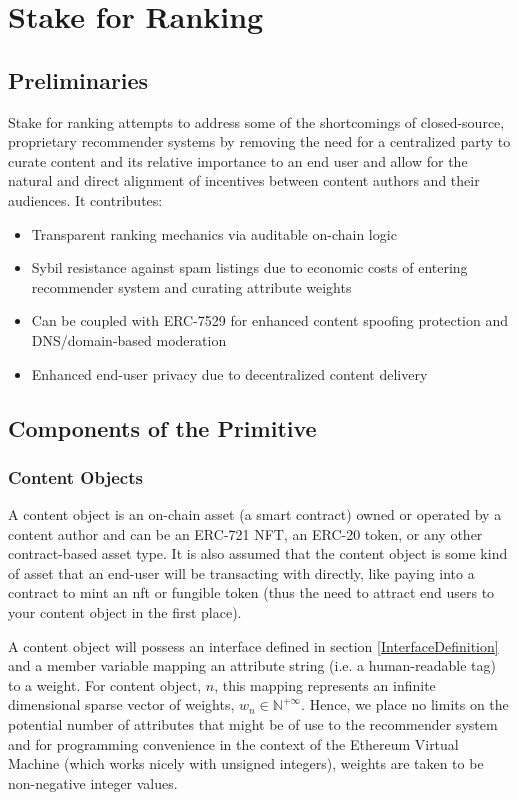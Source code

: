\section{Stake for Ranking} 
\label{section:ProtocolDescription}

\subsection{Preliminaries}
Stake for ranking attempts to address some of the shortcomings of closed-source, proprietary recommender systems by removing the need for a centralized party to curate content and its relative importance to an end user and allow for the natural and direct alignment of incentives between content authors and their audiences. It contributes:
\begin{itemize}
    \item Transparent ranking mechanics via auditable on-chain logic
    \item Sybil resistance against spam listings due to economic costs of entering recommender system and curating attribute weights
    \item Can be coupled with ERC-7529 \cite{chapman2023erc7529} for enhanced content spoofing protection and DNS/domain-based moderation
    \item Enhanced end-user privacy due to decentralized content delivery
\end{itemize}

\subsection{Components of the Primitive}
\subsubsection{Content Objects}
\label{ContentObjectDefinition}

A content object is an on-chain asset (a smart contract) owned or operated by a content author and can be an ERC-721 NFT, an ERC-20 token, or any other contract-based asset type. It is also assumed that the content object is some kind of asset that an end-user will be transacting with directly, like paying into a contract to mint an nft or fungible token (thus the need to attract end users to your content object in the first place). 

A content object will possess an interface defined in section \ref{InterfaceDefinition} and a member variable mapping an attribute string (i.e. a human-readable tag) to a weight. For content object, $n$, this mapping represents an infinite dimensional sparse vector of weights, $w_n \in \mathbb{N}^{+\infty}$. Hence, we place no limits on the potential number of attributes that might be of use to the recommender system and for programming convenience in the context of the Ethereum Virtual Machine \cite{wood2014ethereum} (which works nicely with unsigned integers), weights are taken to be non-negative integer values. 

